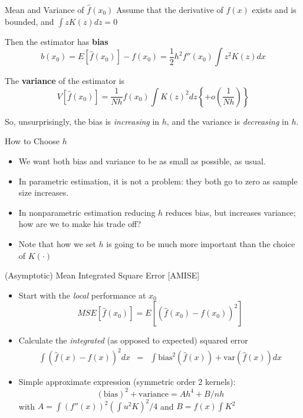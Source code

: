 \documentclass[11pt, aspectratio=169]{beamer}
\begin{document}
\begin{frame}{Mean and Variance of $\hat{f}(x_0)$}
  Assume that the derivative of $f(x)$ exists and is bounded, and  $\int z K(z) d z = 0$

  Then the estimator has \textbf{bias}
  \[
    b(x_0) = E \left[\hat{f}(x_0) \right] - f(x_0) = \frac{1}{2} h^2 f''(x_0)\int z^2K(z)dx
  \]

  The \textbf{variance} of the estimator is
  \[
    V \left[\hat{f}(x_0) \right] = \frac{1}{Nh} f(x_0) \int K(z)^2dz \left\{ + o(\frac{1}{Nh}) \right\}
  \]

  So, unsurprisingly, the bias is \textit{increasing} in $h$, and the variance is \textit{decreasing} in $h$.
\end{frame}
 
\begin{frame}{How to Choose $h$}
  \begin{itemize}
    \item We want both bias and variance to be as small as possible, as usual. 
    \item In parametric estimation, it is not a problem: they both go to zero as sample size increases.
    \item In nonparametric estimation reducing $h$ reduces bias, but increases variance; how are we to make his trade off?
    \item Note that how we set $h$ is going to be much more important than the choice of $K(\cdot)$
  \end{itemize}  
\end{frame}




\begin{frame}{(Asymptotic) Mean Integrated Square Error [AMISE]}
  \begin{itemize}
    \item Start with the \textit{local} performance at $x_0$
    $$ MSE \left[ \hat{f}(x_0) \right] = E \left[ \left( \hat{f}(x_0) - f(x_0) \right)^2 \right] $$
    \item Calculate the \textit{integrated} (as opposed to expected) squared error 
    \begin{align*}
      \int \left( {\hat f}(x)-f(x) \right)^2 dx &=& \int \mbox{bias} ^2 \left( {\hat f}(x) \right) + \mbox{var} \left( {\hat f}(x) \right) dx 
    \end{align*}

  \item Simple approximate expression (symmetric order 2 kernels): $$(\mbox{bias})^2+\mbox{variance}= A
  h^4+B/nh$$
  with $A=\int \left(f''(x)\right)^2 \left(\int u^2K\right)^2 /4$ and $B=f(x)\int K^2$

\end{itemize}  
\end{frame}
\end{document}
